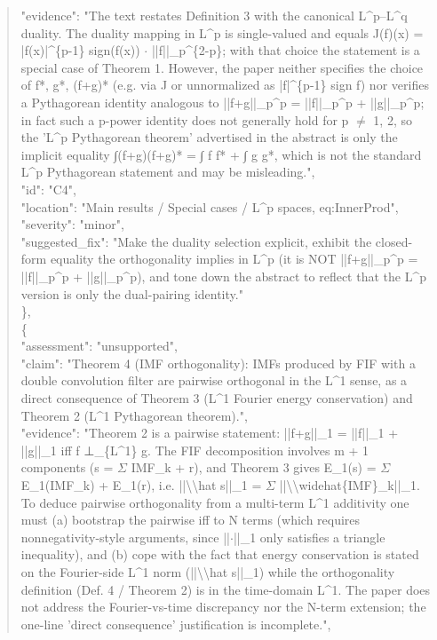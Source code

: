 \documentclass[11pt]{article}
\begin{document}
\begin{quote}
      "evidence": "The text restates Definition 3 with the canonical L\^{}p--L\^{}q duality. The duality mapping in L\^{}p is single-valued and equals J(f)(x) = |f(x)|\^{}\{p-1\} sign(f(x)) \ensuremath{\cdot} ||f||\_p\^{}\{2-p\}; with that choice the statement is a special case of Theorem 1. However, the paper neither specifies the choice of f*, g*, (f+g)* (e.g. via J or unnormalized as |f|\^{}\{p-1\} sign f) nor verifies a Pythagorean identity analogous to ||f+g||\_p\^{}p = ||f||\_p\^{}p + ||g||\_p\^{}p; in fact such a p-power identity does not generally hold for p \ensuremath{\ne} 1, 2, so the 'L\^{}p Pythagorean theorem' advertised in the abstract is only the implicit equality ∫(f+g)(f+g)* = ∫ f f* + ∫ g g*, which is not the standard L\^{}p Pythagorean statement and may be misleading.",\\
      "id": "C4",\\
      "location": "Main results / Special cases / L\^{}p spaces, eq:InnerProd",\\
      "severity": "minor",\\
      "suggested\_fix": "Make the duality selection explicit, exhibit the closed-form equality the orthogonality implies in L\^{}p (it is NOT ||f+g||\_p\^{}p = ||f||\_p\^{}p + ||g||\_p\^{}p), and tone down the abstract to reflect that the L\^{}p version is only the dual-pairing identity."\\
    \},\\
    \{\\
      "assessment": "unsupported",\\
      "claim": "Theorem 4 (IMF orthogonality): IMFs produced by FIF with a double convolution filter are pairwise orthogonal in the L\^{}1 sense, as a direct consequence of Theorem 3 (L\^{}1 Fourier energy conservation) and Theorem 2 (L\^{}1 Pythagorean theorem).",\\
      "evidence": "Theorem 2 is a pairwise statement: ||f+g||\_1 = ||f||\_1 + ||g||\_1 iff f ⊥\_\{L\^{}1\} g. The FIF decomposition involves m + 1 components (s = \ensuremath{\Sigma} IMF\_k + r), and Theorem 3 gives E\_1(s) = \ensuremath{\Sigma} E\_1(IMF\_k) + E\_1(r), i.e. ||\textbackslash{}\textbackslash{}hat s||\_1 = \ensuremath{\Sigma} ||\textbackslash{}\textbackslash{}widehat\{IMF\}\_k||\_1. To deduce pairwise orthogonality from a multi-term L\^{}1 additivity one must (a) bootstrap the pairwise iff to N terms (which requires nonnegativity-style arguments, since ||\ensuremath{\cdot}||\_1 only satisfies a triangle inequality), and (b) cope with the fact that energy conservation is stated on the Fourier-side L\^{}1 norm (||\textbackslash{}\textbackslash{}hat s||\_1) while the orthogonality definition (Def. 4 / Theorem 2) is in the time-domain L\^{}1. The paper does not address the Fourier-vs-time discrepancy nor the N-term extension; the one-line 'direct consequence' justification is incomplete.",\\

\end{quote}
\end{document}
